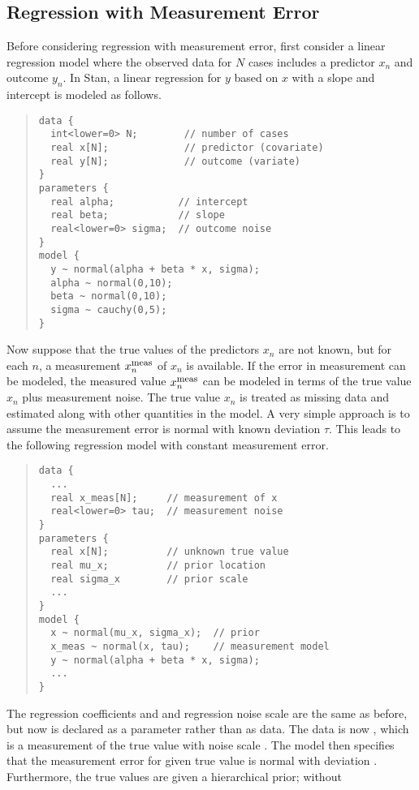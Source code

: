 \subsection{Regression with Measurement Error}

Before considering regression with measurement error, first consider a
linear regression model where the observed data for $N$ cases includes
a predictor $x_n$ and outcome $y_n$.  In Stan, a linear regression for
$y$ based on $x$ with a slope and intercept is modeled as follows.
%
\begin{quote}
\begin{Verbatim}[fontsize=\small]
data {
  int<lower=0> N;        // number of cases
  real x[N];             // predictor (covariate)
  real y[N];             // outcome (variate)
}
parameters {
  real alpha;           // intercept
  real beta;            // slope 
  real<lower=0> sigma;  // outcome noise
}
model {
  y ~ normal(alpha + beta * x, sigma);
  alpha ~ normal(0,10);  
  beta ~ normal(0,10);
  sigma ~ cauchy(0,5);
}
\end{Verbatim}
\end{quote}
%

Now suppose that the true values of the predictors $x_n$ are not
known, but for each $n$, a measurement $x^{\mbox{\footnotesize meas}}_n$ of $x_n$ is available.
If the error in measurement can be modeled, the measured value
$x^{\mbox{\footnotesize meas}}_n$ can be modeled in terms of the true value $x_n$ plus measurement
noise.  The true value $x_n$ is treated as missing data and estimated
along with other quantities in the model.  A very simple approach is
to assume the measurement error is normal with known deviation $\tau$.
This leads to the following regression model with constant measurement
error.
%
\begin{quote}
\begin{Verbatim}[fontsize=\small]
data {
  ...
  real x_meas[N];     // measurement of x
  real<lower=0> tau;  // measurement noise
}
parameters {
  real x[N];          // unknown true value   
  real mu_x;          // prior location
  real sigma_x        // prior scale
  ...
}
model {
  x ~ normal(mu_x, sigma_x);  // prior
  x_meas ~ normal(x, tau);    // measurement model
  y ~ normal(alpha + beta * x, sigma);
  ... 
}
\end{Verbatim}
\end{quote}
%
The regression coefficients  and  and
regression noise scale  are the same as before, but now
 is declared as a parameter rather than as data.  The data is
now , which is a measurement of the true  value
with noise scale .  The model then specifies that the
measurement error for  given true value 
is normal with deviation .  Furthermore, the true values
 are given a hierarchical prior;  without 

